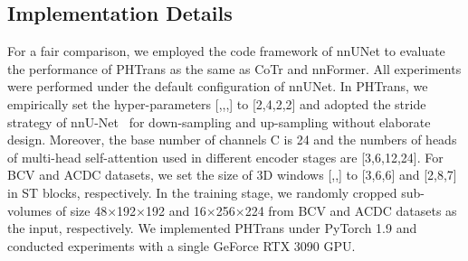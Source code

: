 \documentclass[runningheads]{llncs}
\begin{document}
\subsection{Implementation Details}

For a fair comparison, we employed the code framework of nnUNet\cite{nnunet} to evaluate the performance of PHTrans as the same as CoTr\cite{cotr} and nnFormer\cite{nnformer}. All experiments were performed under the default configuration of nnUNet. In PHTrans, we empirically set the hyper-parameters [,,,] to [2,4,2,2] and adopted the stride strategy of nnU-Net~\cite{nnunet} for down-sampling and up-sampling without elaborate design. Moreover, the base number of channels C is 24 and the numbers of heads of multi-head self-attention used in different encoder stages are [3,6,12,24]. For BCV and ACDC datasets, we set the size of 3D windows [,,] to [3,6,6] and [2,8,7] in ST blocks, respectively. In the training stage, we randomly cropped sub-volumes of size 48×192×192 and 16×256×224 from BCV and ACDC datasets as the input, respectively. We implemented PHTrans under PyTorch 1.9 and conducted experiments with a single GeForce RTX 3090 GPU. 
\end{document}
